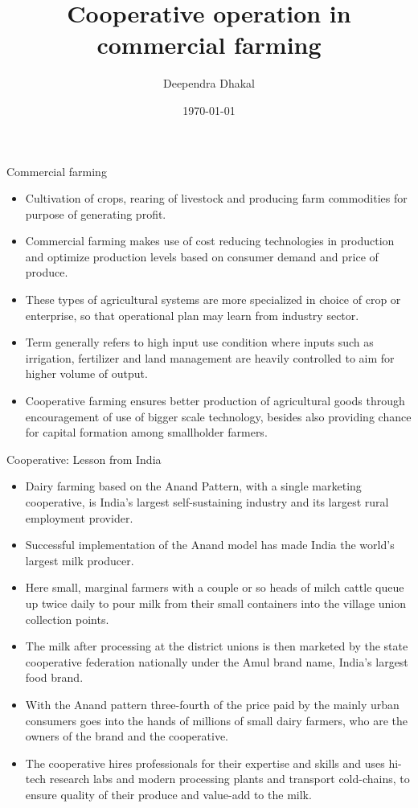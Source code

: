 \documentclass[12pt,ignorenonframetext,aspectratio=169]{beamer}
\title{\insertsectionhead}
  {
    \definecolor{white}{rgb}{0.776,0.357,0.157}
    \definecolor{iqss@orange}{rgb}{1,1,1}
    \ifnum \insertmainframenumber > \insertframenumber
    \frame{
      \frametitle{\iqsssectiontitleheader}
      \tableofcontents[currentsection]
    }
    \else
    \frame{
      \frametitle{Backup Slides}
      \tableofcontents[sectionstyle=shaded/shaded,subsectionstyle=shaded/shaded/shaded]
    }
    \fi
  }
\title[]{Cooperative operation in commercial farming}
\author[
        Deependra Dhakal
    ]{Deependra Dhakal}
\institute[
    ]{
    GAASC, Baitadi \and Tribhuwan University
    }
\date[
      \today
  ]{
      \today
        }
\providecommand{\tightlist}{%
  \setlength{\itemsep}{0pt}\setlength{\parskip}{0pt}}
\begin{document}
  \begin{frame}[plain]
  \titlepage
  \end{frame}



\begin{frame}{Commercial farming}
\protect\hypertarget{commercial-farming}{}
\begin{itemize}
\tightlist
\item
  Cultivation of crops, rearing of livestock and producing farm
  commodities for purpose of generating profit.
\item
  Commercial farming makes use of cost reducing technologies in
  production and optimize production levels based on consumer demand and
  price of produce.
\item
  These types of agricultural systems are more specialized in choice of
  crop or enterprise, so that operational plan may learn from industry
  sector.
\item
  Term generally refers to high input use condition where inputs such as
  irrigation, fertilizer and land management are heavily controlled to
  aim for higher volume of output.
\item
  Cooperative farming ensures better production of agricultural goods
  through encouragement of use of bigger scale technology, besides also
  providing chance for capital formation among smallholder farmers.
\end{itemize}
\end{frame}

\begin{frame}{Cooperative: Lesson from India}
\protect\hypertarget{cooperative-lesson-from-india}{}
\footnotesize

\begin{itemize}
\tightlist
\item
  Dairy farming based on the Anand Pattern, with a single marketing
  cooperative, is India's largest self-sustaining industry and its
  largest rural employment provider.
\item
  Successful implementation of the Anand model has made India the
  world's largest milk producer.
\item
  Here small, marginal farmers with a couple or so heads of milch cattle
  queue up twice daily to pour milk from their small containers into the
  village union collection points.
\item
  The milk after processing at the district unions is then marketed by
  the state cooperative federation nationally under the Amul brand name,
  India's largest food brand.
\item
  With the Anand pattern three-fourth of the price paid by the mainly
  urban consumers goes into the hands of millions of small dairy
  farmers, who are the owners of the brand and the cooperative.
\item
  The cooperative hires professionals for their expertise and skills and
  uses hi-tech research labs and modern processing plants and transport
  cold-chains, to ensure quality of their produce and value-add to the
  milk.
\end{itemize}
\end{frame}
\end{document}
